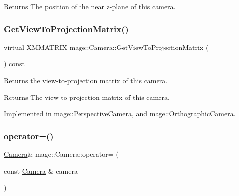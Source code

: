 \begin{DoxyReturn}{Returns}
The position of the near z-\/plane of this camera. 
\end{DoxyReturn}
\hypertarget{classmage_1_1_camera_a1f5206864cf18b5548219492556df5d2}{}\label{classmage_1_1_camera_a1f5206864cf18b5548219492556df5d2} 
\subsubsection{\texorpdfstring{Get\+View\+To\+Projection\+Matrix()}{GetViewToProjectionMatrix()}}
{\footnotesize\ttfamily virtual X\+M\+M\+A\+T\+R\+IX mage\+::\+Camera\+::\+Get\+View\+To\+Projection\+Matrix (\begin{DoxyParamCaption}{ }\end{DoxyParamCaption}) const\hspace{0.3cm}{\ttfamily [pure virtual]}}

Returns the view-\/to-\/projection matrix of this camera.

\begin{DoxyReturn}{Returns}
The view-\/to-\/projection matrix of this camera. 
\end{DoxyReturn}


Implemented in \hyperlink{classmage_1_1_perspective_camera_a83a38a4e8180707df2323130f9cee4a5}{mage\+::\+Perspective\+Camera}, and \hyperlink{classmage_1_1_orthographic_camera_aedd86e56a0f7bc967ad8d9be2631a0cf}{mage\+::\+Orthographic\+Camera}.

\hypertarget{classmage_1_1_camera_afe33e674f74180d6b9566a85eec51ac4}{}\label{classmage_1_1_camera_afe33e674f74180d6b9566a85eec51ac4} 
\subsubsection{\texorpdfstring{operator=()}{operator=()}\hspace{0.1cm}{\footnotesize\ttfamily [1/2]}}
{\footnotesize\ttfamily \hyperlink{classmage_1_1_camera}{Camera}\& mage\+::\+Camera\+::operator= (\begin{DoxyParamCaption}\item[{const \hyperlink{classmage_1_1_camera}{Camera} \&}]{camera }\end{DoxyParamCaption})\hspace{0.3cm}{\ttfamily [default]}}


